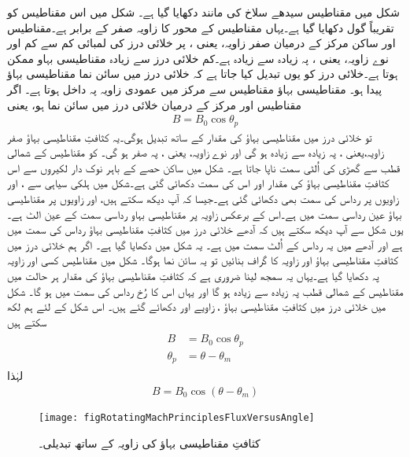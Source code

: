 شکل   میں مقناطیس سیدھے سلاخ کی مانند دکھایا گیا ہے۔ شکل   میں اس مقناطیس کو تقریباً گول دکھایا گیا ہے۔یہاں مقناطیس کے محور کا زاویہ  صفر کے برابر ہے۔مقناطیس اور ساکن مرکز کے درمیان صفر زاویہ، یعنی   ، پر خلائی درز کی لمبائی کم سے کم اور نوے  زاویہ، یعنی  ، پہ زیادہ سے زیادہ ہے۔کم خلائی درز سے زیادہ مقناطیسی بہاو ممکن ہوتا ہے۔خلائی درز کو یوں تبدیل کیا جاتا ہے کہ  خلائی درز میں سائن نما مقناطیسی بہاؤ پیدا ہو۔ مقناطیسی بہاؤ مقناطیس سے مرکز میں عمودی زاویہ پہ داخل ہوتا ہے۔  اگر مقناطیس اور مرکز کے درمیان خلائی درز میں  سائن نما ہو، یعنی
\begin{align}
B=B_0 \cos \theta_p
\end{align}
تو خلائی درز میں مقناطیسی بہاؤ  کی مقدار  کے ساتھ تبدیل ہوگی۔یہ کثافتِ مقناطیسی بہاؤ صفر زاویہ،یعنی ، پہ زیادہ سے زیادہ ہو گی اور نوے زاویہ، یعنی  ، پہ صفر ہو گی۔ کو مقناطیس کے شمالی قطب  سے گھڑی کی اُلٹی سمت ناپا جاتا ہے۔  شکل   میں  ساکن حصے کے باہر نوک دار لکیروں سے اس کثافتِ مقناطیسی بہاؤ کی مقدار اور اس کی سمت دکھائی گئی ہے۔شکل میں ہلکی سیاہی سے ،  اور  زاویوں پر رداس کی سمت بھی دکھائی گئی ہے۔جیسا کہ آپ دیکھ سکتے ہیں، اور   زاویوں پر مقناطیسی بہاؤ عین رداسی سمت میں ہے۔اس کے برعکس زاویہ  پر مقناطیسی بہاو رداسی سمت کے عین الٹ ہے۔یوں شکل سے آپ دیکھ سکتے ہیں کہ  آدھے خلائی درز میں کثافتِ مقناطیسی بہاؤ  رداس کی سمت میں ہے اور آدھے میں یہ رداس کے اُلٹ سمت میں ہے۔  یہ شکل میں دکھایا گیا ہے۔ اگر ہم خلائی درز میں کثافتِ مقناطیسی بہاؤ  اور  زاویہ  کا گراف بنائیں تو یہ سائن نما ہوگا۔ شکل   میں مقناطیس کسی اور زاویہ پہ دکھایا گیا ہے۔یہاں یہ سمجھ لینا ضروری ہے کہ کثافتِ مقناطیسی بہاؤ کی مقدار  ہر حالت میں مقناطیس کے شمالی قطب پہ زیادہ سے زیادہ ہو گا اور یہاں اس کا رُخ رداس کی  سمت میں ہو گا۔ شکل  میں خلائی درز میں کثافتِ مقناطیسی بہاؤ ، زاویے  اور  دکھائے گئے ہیں۔ اس شکل کے لئے ہم لکھ سکتے ہیں
\begin{gather}
\begin{aligned}
B&=B_0 \cos \theta_p\\
\theta_p&=\theta-\theta_m
\end{aligned}
\end{gather}
لہٰذا
\begin{align}
B=B_0 \cos (\theta-\theta_m)
\end{align}
%
\begin{figure}
\centering
\texttt{[image: figRotatingMachPrinciplesFluxVersusAngle]}
\caption{کثافتِ مقناطیسی بہاؤ کی زاویہ کے ساتھ تبدیلی۔}
\label{شکل_گھومتے_مشین_رداس_اور_مقناطیسی_بہاو}
\end{figure}

